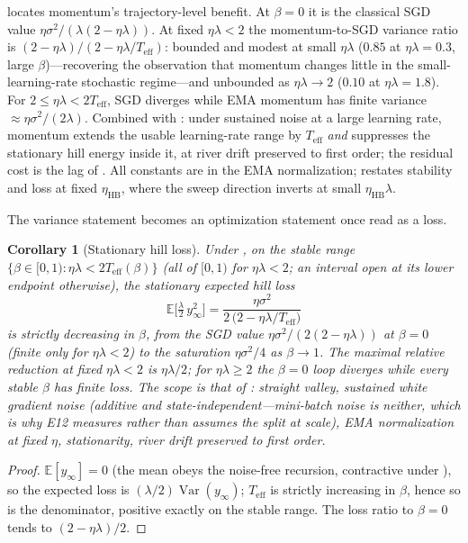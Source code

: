 \documentclass[11pt,a4paper]{article}
\newtheorem{corollary}{Corollary}
\theoremstyle{remark}
\newcommand{\Teff}{T_{\mathrm{eff}}}
\begin{document}
 locates momentum's trajectory-level benefit.
At $\beta=0$ it is the classical SGD value $\eta\sigma^2/(\lambda(2-\eta\lambda))$.
At fixed $\eta\lambda<2$ the momentum-to-SGD variance ratio is $(2-\eta\lambda)/(2-\eta\lambda/\Teff)$: bounded and modest at small $\eta\lambda$ ($0.85$ at $\eta\lambda=0.3$, large $\beta$)---recovering the observation that momentum changes little in the small-learning-rate stochastic regime---and unbounded as $\eta\lambda\to2$ ($0.10$ at $\eta\lambda=1.8$).
For $2\le\eta\lambda<2\Teff$, SGD diverges while EMA momentum has finite variance $\approx\eta\sigma^2/(2\lambda)$.
Combined with : under sustained noise at a large learning rate, momentum extends the usable learning-rate range by $\Teff$ \emph{and} suppresses the stationary hill energy inside it, at river drift preserved to first order; the residual cost is the lag of .
All constants are in the EMA normalization;  restates stability and loss at fixed $\eta_{\mathrm{HB}}$, where the sweep direction inverts at small $\eta_{\mathrm{HB}}\lambda$.

The variance statement becomes an optimization statement once read as a loss.

\begin{corollary}[Stationary hill loss]
\label{cor:hillloss}
Under , on the stable range $\{\beta\in[0,1):\eta\lambda<2\Teff(\beta)\}$ (all of $[0,1)$ for $\eta\lambda<2$; an interval open at its lower endpoint otherwise), the stationary expected hill loss
\[
\mathbb{E}\bigl[\tfrac{\lambda}{2}\,y_\infty^2\bigr]
=\frac{\eta\sigma^2}{2\,\bigl(2-\eta\lambda/\Teff\bigr)}
\]
is strictly decreasing in $\beta$, from the SGD value $\eta\sigma^2/(2(2-\eta\lambda))$ at $\beta=0$ (finite only for $\eta\lambda<2$) to the saturation $\eta\sigma^2/4$ as $\beta\to1$.
The maximal relative reduction at fixed $\eta\lambda<2$ is $\eta\lambda/2$; for $\eta\lambda\ge2$ the $\beta=0$ loop diverges while every stable $\beta$ has finite loss.
The scope is that of : straight valley, sustained white gradient noise (additive and state-independent---mini-batch noise is neither, which is why E12 measures rather than assumes the split at scale), EMA normalization at fixed $\eta$, stationarity, river drift preserved to first order.
\end{corollary}

\begin{proof}
$\mathbb{E}[y_\infty]=0$ (the mean obeys the noise-free recursion, contractive under ), so the expected loss is $(\lambda/2)\operatorname{Var}(y_\infty)$; $\Teff$ is strictly increasing in $\beta$, hence so is the denominator, positive exactly on the stable range.
The loss ratio to $\beta=0$ tends to $(2-\eta\lambda)/2$.
\end{proof}
\end{document}
